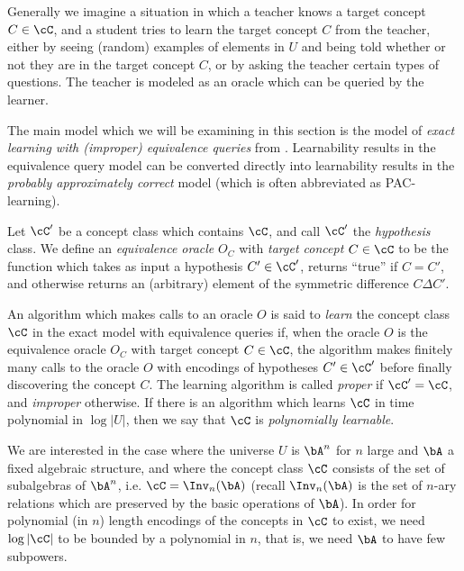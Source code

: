 Generally we imagine a situation in which a teacher knows a target concept $C \in \cC$, and a student tries to learn the target concept $C$ from the teacher, either by seeing (random) examples of elements in $U$ and being told whether or not they are in the target concept $C$, or by asking the teacher certain types of questions. The teacher is modeled as an oracle which can be queried by the learner.

The main model which we will be examining in this section is the model of \emph{exact learning with (improper) equivalence queries} from \cite{angluin-learning}. Learnability results in the equivalence query model can be converted directly into learnability results in the \emph{probably approximately correct} model (which is often abbreviated as PAC-learning).

\begin{defn} Let $\cC'$ be a concept class which contains $\cC$, and call $\cC'$ the \emph{hypothesis} class. We define an \emph{equivalence oracle} $O_C$ with \emph{target concept} $C \in \cC$ to be the function which takes as input a hypothesis $C' \in \cC'$, returns ``true'' if $C = C'$, and otherwise returns an (arbitrary) element of the symmetric difference $C\Delta C'$.
\end{defn}

\begin{defn} An algorithm which makes calls to an oracle $O$ is said to \emph{learn} the concept class $\cC$ in the exact model with equivalence queries if, when the oracle $O$ is the equivalence oracle $O_C$ with target concept $C \in \cC$, the algorithm makes finitely many calls to the oracle $O$ with encodings of hypotheses $C' \in \cC'$ before finally discovering the concept $C$. The learning algorithm is called \emph{proper} if $\cC' = \cC$, and \emph{improper} otherwise. If there is an algorithm which learns $\cC$ in time polynomial in $\log |U|$, then we say that $\cC$ is \emph{polynomially learnable}.
\end{defn}

We are interested in the case where the universe $U$ is $\bA^n$ for $n$ large and $\bA$ a fixed algebraic structure, and where the concept class $\cC$ consists of the set of subalgebras of $\bA^n$, i.e. $\cC = \Inv_n(\bA)$ (recall $\Inv_n(\bA)$ is the set of $n$-ary relations which are preserved by the basic operations of $\bA$). In order for polynomial (in $n$) length encodings of the concepts in $\cC$ to exist, we need $\log |\cC|$ to be bounded by a polynomial in $n$, that is, we need $\bA$ to have few subpowers.

